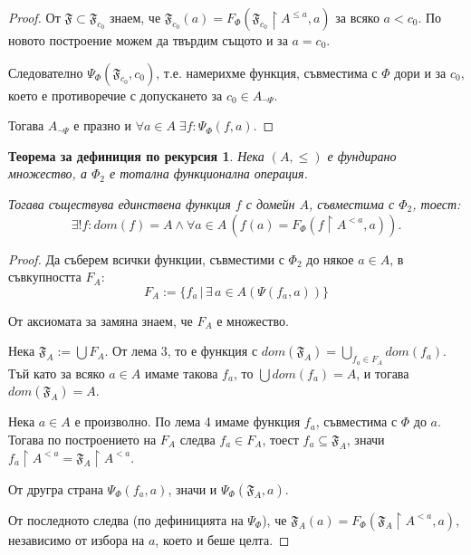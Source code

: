 \documentclass{article}
\theoremstyle{definition}
\begin{document}
\begin{multicols}{2}
\begin{proof}
    От $\mathfrak{F} \subset \mathfrak{F}_{c_0}$ знаем, че $\mathfrak{F}_{c_0}(a) = F_{\Phi}(\mathfrak{F}_{c_0} \upharpoonright A^{\le a}, a)$ за всяко $a < c_0$.
    По новото построение можем да твърдим същото и за $a = c_0$.

    Следователно $\Psi_\Phi(\mathfrak{F}_{c_0}, c_0)$, т.е. намерихме функция, съвместима с $\Phi$ дори и за $c_0$, което е противоречие с допускането за $c_0 \in A_{\neg{\Psi}}$.

    Тогава $A_{\neg{\Psi}}$ е празно и ${\forall a\!\in\!A\;\exists f: \Psi_\Phi(f,a)}$.
\end{proof}

\theoremstyle{plain}
\newtheorem*{rec_theorem}{Теорема за дефиниция по рекурсия}
\begin{rec_theorem}

    Нека $(A,\le)$ е фундирано множество,
    а $\Phi_2$ е тотална функционална операция.

    Тогава съществува единствена функция $f$ с домейн $A$, съвместима с $\Phi_2$, тоест:
    \[
        \exists! f: {
            dom(f) = A \land
            \forall a\!\in\!A\,(f(a) = F_\Phi(f \upharpoonright A^{<a}, a))
        }.
    \]
\end{rec_theorem}

\begin{proof}
    Да съберем всички функции, съвместими с $\Phi_2$ до някое $a \in A$, в съвкупността ${F}_A$:
    \[ F_A := \{f_a\,|\,\exists\,a \in A(\Psi(f_a,a))\} \]

    От аксиомата за замяна знаем, че ${F}_A$ е множество.

    Нека $\mathfrak{F}_A := \bigcup F_A$. От лема 3, то е функция с $dom(\mathfrak{F}_A)=\bigcup_{f_a \in F_A} dom(f_a)$.
    Тъй като за всяко $a \in A$ имаме такова $f_a$, то $\bigcup dom(f_a) = A$, и тогава $dom(\mathfrak{F}_A) = A$.

    Нека $a\!\in\!A$ е произволно.
    По лема 4 имаме функция $f_a$, съвместима с $\Phi$ до $a$. Тогава по построението на $F_A$ следва $f_a \in F_A$, тоест $f_a \subseteq \mathfrak{F}_A$, значи ${f_a \upharpoonright A^{<a} = \mathfrak{F}_A \upharpoonright A^{<a}}$.

    От другра страна $\Psi_\Phi(f_a, a)$, значи и $\Psi_\Phi(\mathfrak{F}_A, a)$.

    От последното следва (по дефиницията на $\Psi_\Phi$), че
    $\mathfrak{F}_A(a) = F_\Phi(\mathfrak{F}_A \upharpoonright A^{<a}, a)$, независимо от избора на $a$, което и беше целта.
\end{proof}

\end{multicols}
\end{document}
